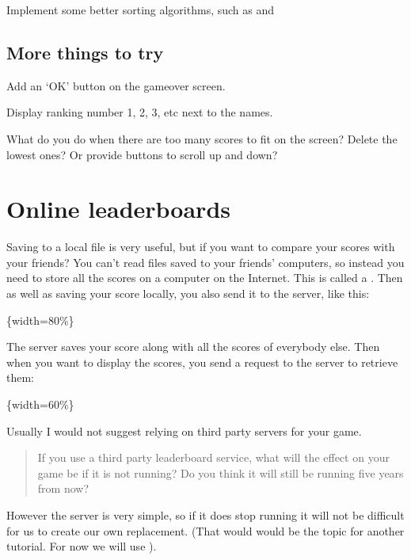 \documentclass[letterpaper,10pt,english]{sphinxmanual}
\begin{document}
\sphinxAtStartPar
Implement some better sorting algorithms, such as 
and 


\section{More things to try}
\label{\detokenize{pandoc_tut:more-things-to-try}}
\sphinxAtStartPar
Add an ‘OK’ button on the gameover screen.

\sphinxAtStartPar
Display ranking number 1, 2, 3, etc next to the names.

\sphinxAtStartPar
What do you do when there are too many scores to fit on the screen?  Delete the lowest ones?  Or provide buttons to scroll up and down?


\chapter{Online leaderboards}
\label{\detokenize{pandoc_tut:online-leaderboards}}
\sphinxAtStartPar
Saving to a local file is very useful, but if you want to compare your scores with your friends?
You can’t read files saved to your friends’ computers, so instead you need to store all the scores
on a computer on the Internet.  This is called a .  Then as well as saving your score
locally, you also send it to the server, like this:

\sphinxAtStartPar
{}\{width=80\%\}

\sphinxAtStartPar
The server saves your score along with all the scores of everybody else.  Then when you want to display the scores, you
send a request to the server to retrieve them:

\sphinxAtStartPar
{}\{width=60\%\}

\sphinxAtStartPar
Usually I would not suggest relying on third party servers for your game.
\begin{quote}

\sphinxAtStartPar
If you use a third party leaderboard service, what will the effect on your game be if it is not running?
Do you think it will still be running five years from now?
\end{quote}

\sphinxAtStartPar
However the  server is very simple, so if it does stop running it will not be difficult for us to create
our own replacement.  (That would would be the topic for another tutorial.  For now we will use ).
\end{document}
